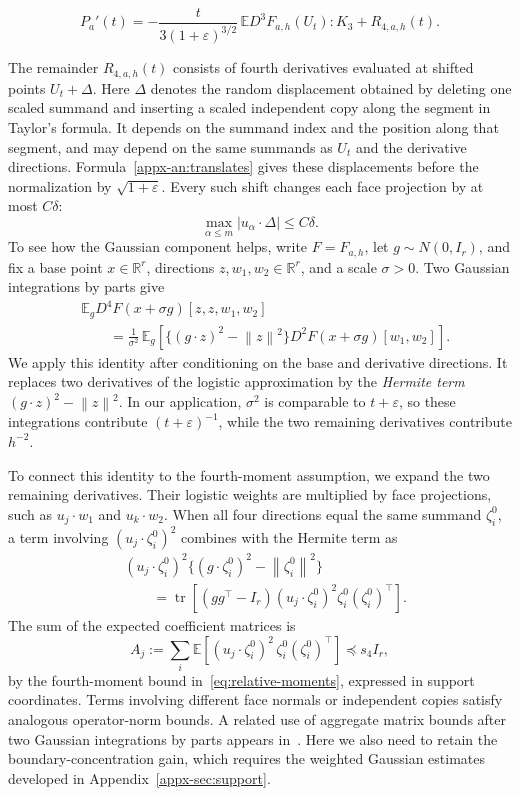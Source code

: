 \documentclass[11pt,letterpaper]{article}
\theoremstyle{remark}
\newcommand{\E}{\mathbb E}
\newcommand{\R}{\mathbb R}
\newcommand{\tr}{\operatorname{tr}}
\newcommand{\norm}[1]{\left\lVert#1\right\rVert}
\begin{document}
\begin{equation}
 P_a'(t)=
 -\frac{t}{3(1+\varepsilon)^{3/2}}\,
       \E D^3F_{a,h}(U_t):K_3+R_{4,a,h}(t).
 \label{eq:path-summary}
\end{equation}
{
{
{
The remainder \(R_{4,a,h}(t)\) consists of fourth derivatives evaluated
at shifted points \(U_t+\Delta\). Here \(\Delta\) denotes the random
displacement obtained by deleting one scaled summand and inserting a
scaled independent copy along the segment in Taylor's formula. It
depends on the summand index and the position along that segment, and
may depend on the same summands as \(U_t\) and the derivative
directions. Formula~\eqref{appx-an:translates} gives these displacements
before the normalization by \(\sqrt{1+\varepsilon}\). Every such shift
changes each face projection by at most \(C\delta\):
\[
 \max_{\alpha\le m}|u_\alpha\cdot\Delta|\le C\delta.
\]
}
} To see how the Gaussian component helps, write \(F=F_{a,h}\),
let \(g\sim N(0,I_r)\), and fix a base point \(x\in\R^r\), directions
\(z,w_1,w_2\in\R^r\), and a scale \(\sigma>0\). Two Gaussian integrations
by parts give
\[
\begin{aligned}
 &\E_g D^4F(x+\sigma g)[z,z,w_1,w_2]\\
 &\qquad=\frac1{\sigma^2}\,
 \E_g\!\left[
 \bigl\{(g\cdot z)^2-\norm z^2\bigr\}
 D^2F(x+\sigma g)[w_1,w_2]
 \right].
\end{aligned}
\]
We apply this identity after conditioning on the base and derivative
directions. It replaces two derivatives of the logistic approximation
by the \emph{Hermite term} \((g\cdot z)^2-\norm z^2\).
In our application, \(\sigma^2\) is comparable to \(t+\varepsilon\),
so these integrations contribute \((t+\varepsilon)^{-1}\), while the
two remaining derivatives contribute \(h^{-2}\).

{
To connect this identity to the fourth-moment assumption, we expand the
 two remaining derivatives. Their logistic weights are multiplied by
 face projections, such as \(u_j\cdot w_1\) and \(u_k\cdot w_2\).
When all four directions equal the same summand \(\zeta_i^0\), a term
involving \((u_j\cdot\zeta_i^0)^2\) combines with the Hermite term as
\[
\begin{aligned}
 &(u_j\cdot\zeta_i^0)^2
 \bigl\{(g\cdot\zeta_i^0)^2-\norm{\zeta_i^0}^2\bigr\}\\
 &\qquad=\tr\!\left[
 (gg^\top-I_r)(u_j\cdot\zeta_i^0)^2
 \zeta_i^0(\zeta_i^0)^\top
 \right].
\end{aligned}
\]
The sum of the expected coefficient matrices is
\[
 A_j:=\sum_i\E\!\left[
 (u_j\cdot\zeta_i^0)^2\,
 \zeta_i^0(\zeta_i^0)^\top
 \right]\preceq s_4I_r,
\]
by the fourth-moment bound in~\eqref{eq:relative-moments}, expressed in
support coordinates. Terms involving different face normals or
independent copies satisfy analogous operator-norm bounds.
{
A related use of aggregate matrix bounds after two Gaussian
integrations by parts appears in~\cite[Lemma~16]{GaoZhang}.
Here we also need to retain the boundary-concentration gain,
which requires the weighted Gaussian estimates developed in
Appendix~\ref{appx-sec:support}.
}
}

}
\end{document}

